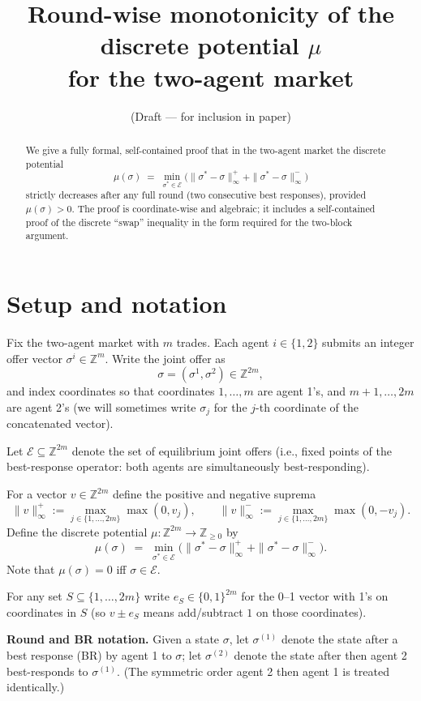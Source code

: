 \documentclass[11pt]{article}
\title{Round-wise monotonicity of the discrete potential \(\mu\)\\
for the two-agent market}
\author{(Draft — for inclusion in paper)}
\date{}
\begin{document}
\maketitle

\begin{abstract}
We give a fully formal, self-contained proof that in the two-agent
market the discrete potential
\[
\mu(\sigma)\;=\;\min_{\sigma^*\in\mathcal E}\big(\|\sigma^*-\sigma\|_\infty^+
+\|\sigma^*-\sigma\|_\infty^-\big)
\]
strictly decreases after any full round (two consecutive best responses),
provided \(\mu(\sigma)>0\). The proof is coordinate-wise and algebraic;
it includes a self-contained proof of the discrete ``swap'' inequality
in the form required for the two-block argument.
\end{abstract}

\section{Setup and notation}

Fix the two-agent market with \(m\) trades. Each agent \(i\in\{1,2\}\)
submits an integer offer vector \(\sigma^i\in\mathbb Z^m\).
Write the joint offer as
\[
\sigma=(\sigma^1,\sigma^2)\in\mathbb Z^{2m},
\]
and index coordinates so that coordinates \(1,\dots,m\) are agent 1's,
and \(m+1,\dots,2m\) are agent 2's (we will sometimes write
\(\sigma_j\) for the \(j\)-th coordinate of the concatenated vector).

Let \(\textstyle \mathcal E\subseteq\mathbb Z^{2m}\) denote the set of
equilibrium joint offers (i.e., fixed points of the best-response
operator: both agents are simultaneously best-responding).

For a vector \(v\in\mathbb Z^{2m}\) define the positive and negative
suprema
\[
\|v\|_\infty^+ := \max_{j\in\{1,\dots,2m\}} \max(0,v_j),\qquad
\|v\|_\infty^- := \max_{j\in\{1,\dots,2m\}} \max(0,-v_j).
\]
Define the discrete potential \(\mu:\mathbb Z^{2m}\to\mathbb Z_{\ge0}\) by
\[
\mu(\sigma) \;=\; \min_{\sigma^*\in\mathcal E}
\Big(\|\sigma^*-\sigma\|_\infty^+ + \|\sigma^*-\sigma\|_\infty^-\Big).
\]
Note that \(\mu(\sigma)=0\) iff \(\sigma\in\mathcal E\).

For any set \(S\subseteq\{1,\dots,2m\}\) write \(e_S\in\{0,1\}^{2m}\)
for the 0–1 vector with 1's on coordinates in \(S\) (so \(v\pm e_S\)
means add/subtract \(1\) on those coordinates).

\medskip

\noindent\textbf{Round and BR notation.} Given a state \(\sigma\),
let \(\sigma^{(1)}\) denote the state after a best response (BR)
by agent 1 to \(\sigma\); let \(\sigma^{(2)}\) denote the state after
then agent 2 best-responds to \(\sigma^{(1)}\). (The symmetric order
agent 2 then agent 1 is treated identically.)
\end{document}
